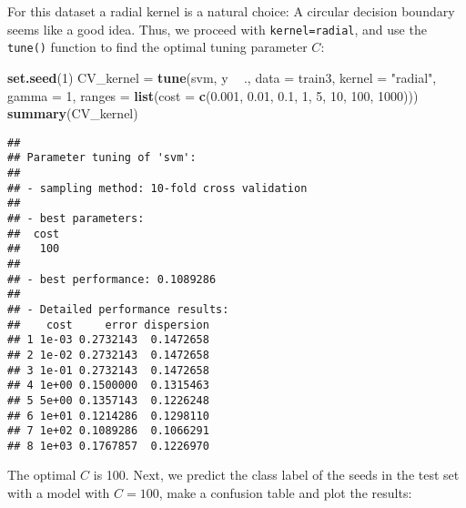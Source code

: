 \documentclass[10pt,ignorenonframetext,]{beamer}
\newenvironment{Shaded}{\begin{snugshade}}{\end{snugshade}}
\newcommand{\KeywordTok}[1]{\textcolor[rgb]{0.13,0.29,0.53}{\textbf{#1}}}
\newcommand{\DataTypeTok}[1]{\textcolor[rgb]{0.13,0.29,0.53}{#1}}
\newcommand{\DecValTok}[1]{\textcolor[rgb]{0.00,0.00,0.81}{#1}}
\newcommand{\FloatTok}[1]{\textcolor[rgb]{0.00,0.00,0.81}{#1}}
\newcommand{\StringTok}[1]{\textcolor[rgb]{0.31,0.60,0.02}{#1}}
\newcommand{\OperatorTok}[1]{\textcolor[rgb]{0.81,0.36,0.00}{\textbf{#1}}}
\newcommand{\NormalTok}[1]{#1}
\begin{document}
\begin{frame}[fragile]

For this dataset a radial kernel is a natural choice: A circular
decision boundary seems like a good idea. Thus, we proceed with
\texttt{kernel=\textquotesingle{}radial\textquotesingle{}}, and use the
\texttt{tune()} function to find the optimal tuning parameter \(C\):

\tiny

\begin{Shaded}
\begin{Highlighting}[]
\KeywordTok{set.seed}\NormalTok{(}\DecValTok{1}\NormalTok{)}
\NormalTok{CV_kernel =}\StringTok{ }\KeywordTok{tune}\NormalTok{(svm, y }\OperatorTok{~}\StringTok{ }\NormalTok{., }\DataTypeTok{data =}\NormalTok{ train3, }\DataTypeTok{kernel =} \StringTok{"radial"}\NormalTok{, }\DataTypeTok{gamma =} \DecValTok{1}\NormalTok{, }
    \DataTypeTok{ranges =} \KeywordTok{list}\NormalTok{(}\DataTypeTok{cost =} \KeywordTok{c}\NormalTok{(}\FloatTok{0.001}\NormalTok{, }\FloatTok{0.01}\NormalTok{, }\FloatTok{0.1}\NormalTok{, }\DecValTok{1}\NormalTok{, }\DecValTok{5}\NormalTok{, }\DecValTok{10}\NormalTok{, }\DecValTok{100}\NormalTok{, }\DecValTok{1000}\NormalTok{)))}
\KeywordTok{summary}\NormalTok{(CV_kernel)}
\end{Highlighting}
\end{Shaded}

\begin{verbatim}
## 
## Parameter tuning of 'svm':
## 
## - sampling method: 10-fold cross validation 
## 
## - best parameters:
##  cost
##   100
## 
## - best performance: 0.1089286 
## 
## - Detailed performance results:
##    cost     error dispersion
## 1 1e-03 0.2732143  0.1472658
## 2 1e-02 0.2732143  0.1472658
## 3 1e-01 0.2732143  0.1472658
## 4 1e+00 0.1500000  0.1315463
## 5 5e+00 0.1357143  0.1226248
## 6 1e+01 0.1214286  0.1298110
## 7 1e+02 0.1089286  0.1066291
## 8 1e+03 0.1767857  0.1226970
\end{verbatim}

\normalsize

\end{frame}

\begin{frame}[fragile]

The optimal \(C\) is 100. Next, we predict the class label of the seeds
in the test set with a model with \(C=100\), make a confusion table and
plot the results:

\scriptsize

\begin{Shaded}
\end{Shaded}

\end{frame}
\end{document}
